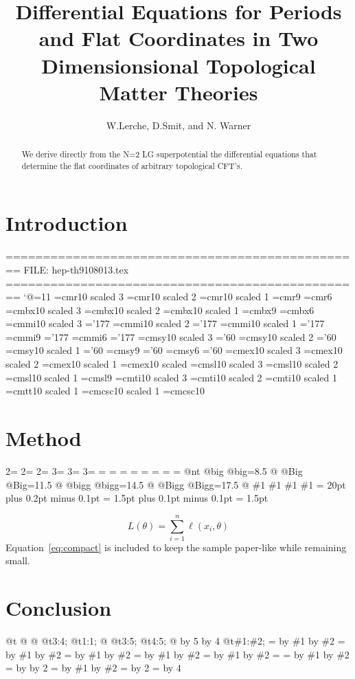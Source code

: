 \documentclass[11pt]{article}
\title{Differential Equations for Periods and Flat Coordinates in Two
  Dimensionsional Topological Matter Theories}
\author{W.Lerche, D.Smit, and N. Warner}
\date{}
\begin{document}
\maketitle
\begin{abstract}

We derive directly from the N=2 LG superpotential the differential equations that determine the flat coordinates of arbitrary topological CFT's.

\end{abstract}

\section{Introduction}

================================================ FILE: hep-th9108013.tex ================================================ `@=11 =cmr10 scaled 3 =cmr10 scaled 2 =cmr10 scaled 1 =cmr9 =cmr6 =cmbx10 scaled 3 =cmbx10 scaled 2 =cmbx10 scaled 1 =cmbx9 =cmbx6 =cmmi10 scaled 3 ='177 =cmmi10 scaled 2 ='177 =cmmi10 scaled 1 ='177 =cmmi9 ='177 =cmmi6 ='177 =cmsy10 scaled 3 ='60 =cmsy10 scaled 2 ='60 =cmsy10 scaled 1 ='60 =cmsy9 ='60 =cmsy6 ='60 =cmex10 scaled 3 =cmex10 scaled 2 =cmex10 scaled 1 =cmex10 scaled =cmsl10 scaled 3 =cmsl10 scaled 2 =cmsl10 scaled 1 =cmsl9 =cmti10 scaled 3 =cmti10 scaled 2 =cmti10 scaled 1 =cmtt10 scaled 1 =cmcsc10 scaled 1 =cmcsc10

\section{Method}

2= 2= 2= 3= 3= 3= = = = = = = = = @nt @big @big=8.5 @ @Big @Big=11.5 @ @bigg @bigg=14.5 @ @Bigg @Bigg=17.5 @ \#1 \#1 \#1 \#1 = 20pt plus 0.2pt minus 0.1pt = 1.5pt plus 0.1pt minus 0.1pt = 1.5pt

\begin{equation}
\label{eq:compact}
L(\theta) = \sum_{i=1}^{n} \ell(x_i, \theta)
\end{equation}
Equation~\ref{eq:compact} is included to keep the sample paper-like while remaining small.

\section{Conclusion}

@t @ @ @t3:4; @t1:1; @ @t3:5; @t4:5; @ by 5 by 4 @t\#1:\#2; = by \#1 by \#2 = by \#1 by \#2 = by \#1 by \#2 = by \#1 by \#2 = by \#1 by \#2 = = by \#1 by \#2 = by by 2 = by \#1 by \#2 = by 2 = by 4
\end{document}

